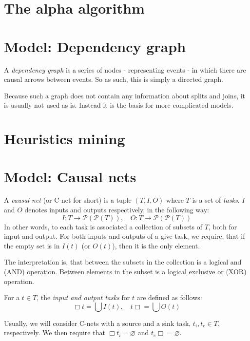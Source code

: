 \documentclass[12pt, a4paper]{article}
\numberwithin{equation}{section}
\begin{document}
\section{The alpha algorithm}

\section{Model: Dependency graph}
A \textit{dependency graph} is a series of nodes - representing events - in which there are causal arrows between events. So as such, this is simply a directed graph.

Because such a graph does not contain any information about splits and joins, it is usually not used as is. Instead it is the basis for more complicated models.

\section{Heuristics mining}


\section{Model: Causal nets}
A \textit{causal net} (or C-net for short) is a tuple $(T,I,O)$ where $T$ is a set of \textit{tasks}. $I$ and $O$ denotes inputs and outputs respectively, in the following way:
\begin{equation}
I: T\rightarrow\mathcal{P}(\mathcal{P}(T)),\quad
O: T\rightarrow\mathcal{P}(\mathcal{P}(T))
\end{equation}
In other words, to each task is associated a collection of subsets of $T$, both for input and output. For both inputs and outputs of a give task, we require, that if the empty set is in $I(t)$ (or $O(t)$), then it is the only element.

The interpretation is, that between the subsets in the collection is a logical and (AND) operation. Between elements in the subset is a logical exclusive or (XOR) operation.

For a $t\in T$, the \textit{input and output tasks} for $t$ are defined as follows:
\begin{equation}
\Box t=\bigcup I(t),\quad t\Box=\bigcup O(t)
\end{equation}

Usually, we will consider C-nets with a source and a sink task, $t_i, t_e\in T$, respectively. We then require that $\Box t_i=\varnothing$ and $t_e\Box=\varnothing$.
\end{document}
